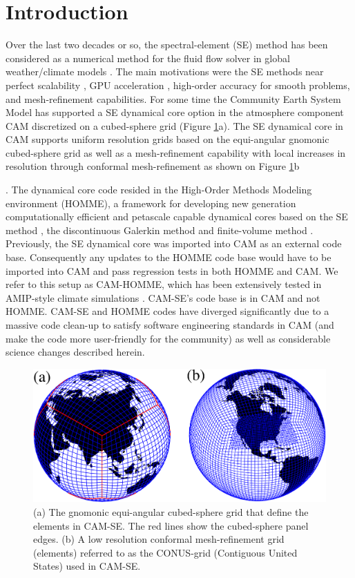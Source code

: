 \documentclass{agujournal}
\begin{document}
\section{Introduction}
Over the last two decades or so, the spectral-element (SE) method has been considered as a numerical method for the fluid flow solver in  global weather/climate models \citep{FT2004MWR,BWTF2006MWR,KG2012JCP,GKC2013SIAM,CH2016APJAS}. The main motivations were the SE methods near perfect scalability \citep{DetAl2012IJHPCA}, GPU acceleration \citep[e.g.][]{AWWGIJHPCA,AetAl2017IJHPCA}, high-order accuracy for smooth problems, and mesh-refinement capabilities. For some time the Community Earth System Model \citep[CESM; ][]{CESM1} has supported a SE dynamical core option in the atmosphere component CAM \citep[Community Atmosphere Model; ][]{CAM5} discretized on a cubed-sphere grid (Figure \ref{fig:grids}a). The SE dynamical core in CAM supports uniform resolution grids based on the equi-angular gnomonic cubed-sphere grid as well as a mesh-refinement capability with local increases in resolution through conformal mesh-refinement as shown on Figure \ref{fig:grids}b {\citep{FT2004MWR,BWTF2006MWR,ZJT2013,ZetAl2014JCb}. The dynamical core code resided in the High-Order Methods Modeling environment (HOMME), a framework for developing new generation computationally efficient and petascale capable dynamical cores based on the SE method \citep{TL2000JSC,TES2008JPCS}, the discontinuous Galerkin method \citep{NCT2009CF} and finite-volume method \citep{ELGT2012PCS,LTOUNGK2017MWR}. Previously, the SE dynamical core was imported into CAM as an external code base. Consequently any updates to the HOMME code base would have to be imported into CAM and pass regression tests in both HOMME and CAM. We refer to this setup as CAM-HOMME, which has been extensively tested in AMIP-style climate simulations \citep[e.g., ][]{ELMNTT2012JC,ZJ2014JAMES,RetAl2015GRL,BetAl2016CC,RHUZ2016JAMC,GetAl2017JAMES}. CAM-SE's code base is in CAM and not HOMME. CAM-SE and HOMME codes have diverged significantly due to a  massive code clean-up to satisfy software engineering standards in CAM (and make the code more user-friendly for the community) as well as considerable science changes described herein.
  \begin{figure}[h]
\centering
 \includegraphics[scale=0.45]{figs/grids}
 \caption{(a) The gnomonic equi-angular cubed-sphere grid that define the elements in CAM-SE. The red lines show the cubed-sphere panel edges. (b) A low resolution conformal mesh-refinement grid (elements) referred to as the CONUS-grid (Contiguous United States) used in CAM-SE.}
 \label{fig:grids}
\end{figure}


}
\end{document}

